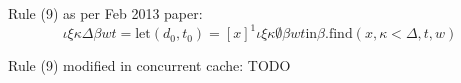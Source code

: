 \documentclass{article}
\begin{document}
Rule (9) as per Feb 2013 paper:
\begin{displaymath}
  [x]\iota\xi\kappa\Delta\beta wt
  = \text{let} (d_0, t_0) = [x]^1\iota\xi\kappa\emptyset\beta wt
  \text{in} \beta.\text{find}(x,\kappa<\Delta,t,w)
\end{displaymath}

Rule (9) modified in concurrent cache:
TODO
\end{document}
